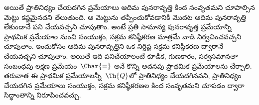 \documentclass[../../../include/open-logic-section]{subfiles}
\begin{document}
అయితే ప్రాతినిధ్యం చేయదగిన ప్రమేయాలు ఆదిమ పునరావృత్తి కింద సంవృతమని
చూపాల్సిన మెట్టు కష్టమైనదని తేలుతుంది. ఆ మెట్టును తప్పించుకోవడానికి మొదట
ఆదిమ పునరావృత్తి లేకుండానే పని చేయవచ్చని చూపుతాం. అంటే ప్రతి సామాన్య
పునరావృత్త ప్రమేయాన్ని ప్రాథమిక ప్రమేయాల నుంచి సంయుక్తం, సక్రమ కనిష్ఠీకరణ
మాత్రమే వాడి నిర్వచించవచ్చని చూపుతాం. ఇందుకోసం ఆదిమ పునరావృత్తిని ఒక
నిర్దిష్ట సక్రమ కనిష్ఠీకరణ ద్వారానే చేయవచ్చని చూపుతాం. అయితే ఇది పనిచేయాలంటే
కూడిక, గుణకారం, సర్వసమానతా సంబంధపు లక్షణ ప్రమేయం~$\Char{=}$ అనే కొన్ని అదనపు
ప్రాథమిక ప్రమేయాలను చేర్చాలి. తరువాత ఈ ప్రాథమిక ప్రమేయాలన్నీ~$\Th{Q}$లో
ప్రాతినిధ్యం చేయదగినవని, ప్రాతినిధ్యం చేయదగిన ప్రమేయాలు సంయుక్తం, సక్రమ
కనిష్ఠీకరణల కింద సంవృతమని చూపడం ద్వారా సిద్ధాంతాన్ని నిరూపించవచ్చు.
\end{document}
